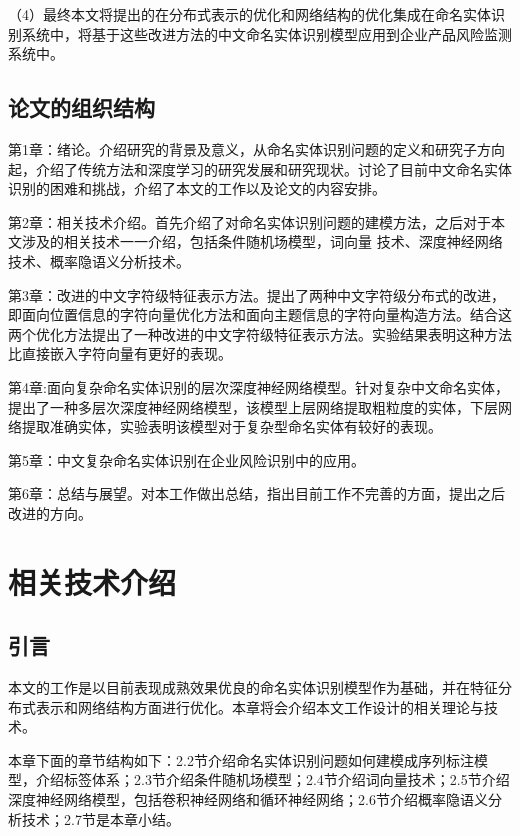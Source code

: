 \documentclass[winfonts,master,oneside,nobackinfo]{njuthesis}
\begin{document}
（4）最终本文将提出的在分布式表示的优化和网络结构的优化集成在命名实体识别系统中，将基于这些改进方法的中文命名实体识别模型应用到企业产品风险监测系统中。

\section{论文的组织结构}
第1章：绪论。介绍研究的背景及意义，从命名实体识别问题的定义和研究子方向起，介绍了传统方法和深度学习的研究发展和研究现状。讨论了目前中文命名实体识别的困难和挑战，介绍了本文的工作以及论文的内容安排。

第2章：相关技术介绍。首先介绍了对命名实体识别问题的建模方法，之后对于本文涉及的相关技术一一介绍，包括条件随机场模型，词向量
技术、深度神经网络技术、概率隐语义分析技术。

第3章：改进的中文字符级特征表示方法。提出了两种中文字符级分布式的改进，即面向位置信息的字符向量优化方法和面向主题信息的字符向量构造方法。结合这两个优化方法提出了一种改进的中文字符级特征表示方法。实验结果表明这种方法比直接嵌入字符向量有更好的表现。

第4章:面向复杂命名实体识别的层次深度神经网络模型。针对复杂中文命名实体，提出了一种多层次深度神经网络模型，该模型上层网络提取粗粒度的实体，下层网络提取准确实体，实验表明该模型对于复杂型命名实体有较好的表现。

第5章：中文复杂命名实体识别在企业风险识别中的应用。

第6章：总结与展望。对本工作做出总结，指出目前工作不完善的方面，提出之后改进的方向。

\chapter{相关技术介绍}

\section{引言}
本文的工作是以目前表现成熟效果优良的命名实体识别模型作为基础，并在特征分布式表示和网络结构方面进行优化。本章将会介绍本文工作设计的相关理论与技术。

本章下面的章节结构如下：2.2节介绍命名实体识别问题如何建模成序列标注模型，介绍标签体系；2.3节介绍条件随机场模型；2.4节介绍词向量技术；2.5节介绍深度神经网络模型，包括卷积神经网络和循环神经网络；2.6节介绍概率隐语义分析技术；2.7节是本章小结。
\end{document}
